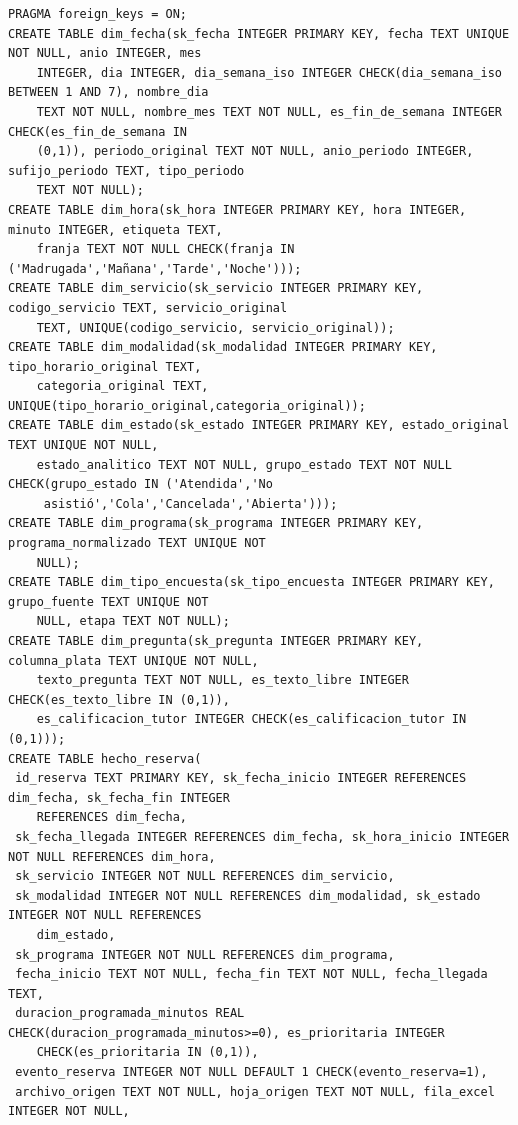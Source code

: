\documentclass[11pt,letterpaper]{article}
\begin{document}
\begingroup\footnotesize\begin{verbatim}
PRAGMA foreign_keys = ON;
CREATE TABLE dim_fecha(sk_fecha INTEGER PRIMARY KEY, fecha TEXT UNIQUE NOT NULL, anio INTEGER, mes 
    INTEGER, dia INTEGER, dia_semana_iso INTEGER CHECK(dia_semana_iso BETWEEN 1 AND 7), nombre_dia 
    TEXT NOT NULL, nombre_mes TEXT NOT NULL, es_fin_de_semana INTEGER CHECK(es_fin_de_semana IN 
    (0,1)), periodo_original TEXT NOT NULL, anio_periodo INTEGER, sufijo_periodo TEXT, tipo_periodo 
    TEXT NOT NULL);
CREATE TABLE dim_hora(sk_hora INTEGER PRIMARY KEY, hora INTEGER, minuto INTEGER, etiqueta TEXT, 
    franja TEXT NOT NULL CHECK(franja IN ('Madrugada','Mañana','Tarde','Noche')));
CREATE TABLE dim_servicio(sk_servicio INTEGER PRIMARY KEY, codigo_servicio TEXT, servicio_original 
    TEXT, UNIQUE(codigo_servicio, servicio_original));
CREATE TABLE dim_modalidad(sk_modalidad INTEGER PRIMARY KEY, tipo_horario_original TEXT, 
    categoria_original TEXT, UNIQUE(tipo_horario_original,categoria_original));
CREATE TABLE dim_estado(sk_estado INTEGER PRIMARY KEY, estado_original TEXT UNIQUE NOT NULL, 
    estado_analitico TEXT NOT NULL, grupo_estado TEXT NOT NULL CHECK(grupo_estado IN ('Atendida','No
     asistió','Cola','Cancelada','Abierta')));
CREATE TABLE dim_programa(sk_programa INTEGER PRIMARY KEY, programa_normalizado TEXT UNIQUE NOT 
    NULL);
CREATE TABLE dim_tipo_encuesta(sk_tipo_encuesta INTEGER PRIMARY KEY, grupo_fuente TEXT UNIQUE NOT 
    NULL, etapa TEXT NOT NULL);
CREATE TABLE dim_pregunta(sk_pregunta INTEGER PRIMARY KEY, columna_plata TEXT UNIQUE NOT NULL, 
    texto_pregunta TEXT NOT NULL, es_texto_libre INTEGER CHECK(es_texto_libre IN (0,1)), 
    es_calificacion_tutor INTEGER CHECK(es_calificacion_tutor IN (0,1)));
CREATE TABLE hecho_reserva(
 id_reserva TEXT PRIMARY KEY, sk_fecha_inicio INTEGER REFERENCES dim_fecha, sk_fecha_fin INTEGER 
    REFERENCES dim_fecha,
 sk_fecha_llegada INTEGER REFERENCES dim_fecha, sk_hora_inicio INTEGER NOT NULL REFERENCES dim_hora,
 sk_servicio INTEGER NOT NULL REFERENCES dim_servicio,
 sk_modalidad INTEGER NOT NULL REFERENCES dim_modalidad, sk_estado INTEGER NOT NULL REFERENCES 
    dim_estado,
 sk_programa INTEGER NOT NULL REFERENCES dim_programa,
 fecha_inicio TEXT NOT NULL, fecha_fin TEXT NOT NULL, fecha_llegada TEXT,
 duracion_programada_minutos REAL CHECK(duracion_programada_minutos>=0), es_prioritaria INTEGER 
    CHECK(es_prioritaria IN (0,1)),
 evento_reserva INTEGER NOT NULL DEFAULT 1 CHECK(evento_reserva=1),
 archivo_origen TEXT NOT NULL, hoja_origen TEXT NOT NULL, fila_excel INTEGER NOT NULL, 

\end{verbatim}
\end{document}
